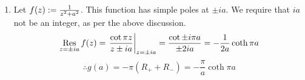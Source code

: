 \begin{enumerate}[wide, labelindent = 0pt, label = (\alph*)]
\item
Let $f(z) := \frac{1}{z^2 + a^2}$. This function has simple poles at $\pm ia$.
We require that $ia$ not be an integer, as per the above discussion.
\[
    \mathop{\mathrm{Res}}_{z = \pm ia}{f(z)}
    = {\left. \frac{\cot \pi z}{z \pm ia} \right|}_{z = \pm ia}
    = \frac{\cot \pm i\pi a}{\pm 2ia}
    = -\frac{1}{2a} \coth \pi a
\]
\[
    \therefore g(a)
    = -\pi \left( R_+ + R_- \right)
    = -\frac{\pi}{a} \coth \pi a
\]

\end{enumerate}